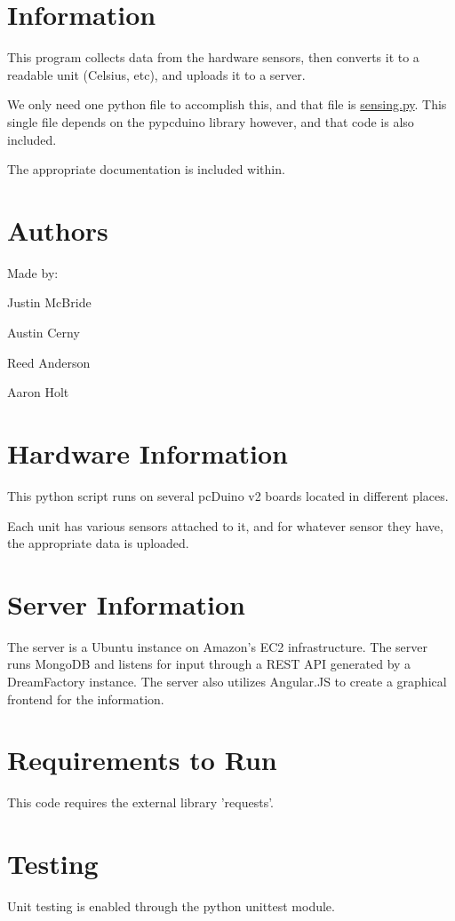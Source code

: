 \hypertarget{index_information}{}\section{Information}\label{index_information}
This program collects data from the hardware sensors, then converts it to a readable unit (Celsius, etc), and uploads it to a server.

We only need one python file to accomplish this, and that file is \hyperlink{sensing_8py}{sensing.\-py}. This single file depends on the pypcduino library however, and that code is also included.

The appropriate documentation is included within.\hypertarget{index_authors}{}\section{Authors}\label{index_authors}
Made by\-:
\begin{DoxyItemize}
\item Justin Mc\-Bride
\item Austin Cerny
\item Reed Anderson
\item Aaron Holt
\end{DoxyItemize}\hypertarget{index_hardwareinfo}{}\section{Hardware Information}\label{index_hardwareinfo}
This python script runs on several pc\-Duino v2 boards located in different places.

Each unit has various sensors attached to it, and for whatever sensor they have, the appropriate data is uploaded.\hypertarget{index_serverinfo}{}\section{Server Information}\label{index_serverinfo}
The server is a Ubuntu instance on Amazon's E\-C2 infrastructure. The server runs Mongo\-D\-B and listens for input through a R\-E\-S\-T A\-P\-I generated by a Dream\-Factory instance. The server also utilizes Angular.\-J\-S to create a graphical frontend for the information.\hypertarget{index_requirements}{}\section{Requirements to Run}\label{index_requirements}
This code requires the external library 'requests'.\hypertarget{index_testing}{}\section{Testing}\label{index_testing}
Unit testing is enabled through the python unittest module.


